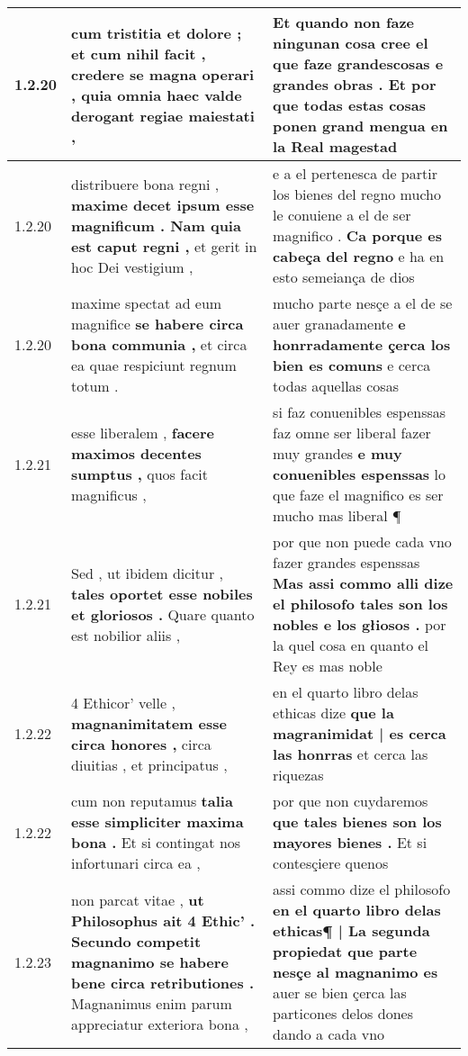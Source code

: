 \begin{tabular}{|p{1cm}|p{6.5cm}|p{6.5cm}|}
1.2.20 & cum tristitia et dolore ; et cum nihil facit , \textbf{ credere se magna operari , } quia omnia haec valde derogant regiae maiestati , & Et quando non faze ningunan cosa cree el \textbf{ que faze grandescosas e grandes obras . } Et por que todas estas cosas ponen grand mengua en la Real magestad \\\hline
1.2.20 & distribuere bona regni , \textbf{ maxime decet ipsum esse magnificum . Nam quia est caput regni , } et gerit in hoc Dei vestigium , & e a el pertenesca de partir los bienes del regno mucho le conuiene a el de ser magnifico . \textbf{ Ca porque es cabeça del regno } e ha en esto semeiança de dios \\\hline
1.2.20 & maxime spectat ad eum magnifice \textbf{ se habere circa bona communia , } et circa ea quae respiciunt regnum totum . & mucho parte nesçe a el de se auer granadamente \textbf{ e honrradamente çerca los bien es comuns } e cerca todas aquellas cosas \\\hline
1.2.21 & esse liberalem , \textbf{ facere maximos decentes sumptus , } quos facit magnificus , & si faz conuenibles espenssas faz omne ser liberal fazer muy grandes \textbf{ e muy conuenibles espenssas } lo que faze el magnifico es ser mucho mas liberal ¶ \\\hline
1.2.21 & Sed , ut ibidem dicitur , \textbf{ tales oportet esse nobiles et gloriosos . } Quare quanto est nobilior aliis , & por que non puede cada vno fazer grandes espenssas \textbf{ Mas assi commo alli dize el philosofo tales son los nobles e los głiosos . } por la quel cosa en quanto el Rey es mas noble \\\hline
1.2.22 & 4 Ethicor’ velle , \textbf{ magnanimitatem esse circa honores , } circa diuitias , et principatus , & en el quarto libro delas ethicas dize \textbf{ que la magranimidat | es cerca las honrras } et cerca las riquezas \\\hline
1.2.22 & cum non reputamus \textbf{ talia esse simpliciter maxima bona . } Et si contingat nos infortunari circa ea , & por que non cuydaremos \textbf{ que tales bienes son los mayores bienes . } Et si contesçiere quenos \\\hline
1.2.23 & non parcat vitae , \textbf{ ut Philosophus ait 4 Ethic’ . Secundo competit magnanimo se habere bene circa retributiones . } Magnanimus enim parum appreciatur exteriora bona , & assi commo dize el philosofo \textbf{ en el quarto libro delas ethicas¶ | La segunda propiedat que parte nesçe al magnanimo es } auer se bien çerca las particones delos dones dando a cada vno \\\hline

\end{tabular}
